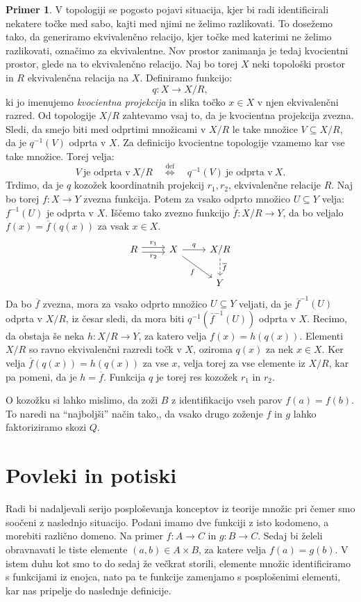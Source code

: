 \documentclass[12pt,a4paper]{book}
\theoremstyle{definition}
\theoremstyle{plain}
\theoremstyle{definition}
\newtheorem{primer}{Primer}[section]
\theoremstyle{remark}
\begin{document}
\begin{primer}
V topologiji se pogosto pojavi situacija, kjer bi radi identificirali nekatere točke med sabo, kajti med njimi ne želimo razlikovati. To dosežemo tako, da generiramo ekvivalenčno relacijo, kjer točke med katerimi ne želimo razlikovati, označimo za ekvivalentne. Nov prostor zanimanja je tedaj kvocientni prostor, glede na to ekvivalenčno relacijo.  Naj bo torej $X$ neki topološki prostor in $R$ ekvivalenčna relacija na $X$. Definiramo funkcijo:
$$ q : X \to X/R,$$
ki jo imenujemo \emph{kvocientna projekcija} in slika točko $x \in X$ v njen ekvivalenčni razred. Od topologije $X/R$ zahtevamo vsaj to, da je kvocientna projekcija zvezna. Sledi, da smejo biti med odprtimi množicami v $X/R$ le take množice $V \subseteq X/R$, da je $q^{-1}(V)$ odprta v $X$. Za definicijo kvocientne topologije vzamemo kar vse take množice. Torej velja:
$$V \ \text{je odprta v} \ X/R \quad \overset{\text{def}}{\Leftrightarrow} \quad q^{-1}(V) \ \text{je odprta v} \ X.$$
Trdimo, da je $q$ kozožek koordinatnih projekcij $r_1,r_2$, ekvivalenčne relacije $R$.
Naj bo torej $f : X \to Y$ zvezna funkcija. Potem za vsako odprto množico $U \subseteq Y$ velja: $f^{-1}(U)$ je odprta v $X$. Iščemo tako zvezno funkcijo $\overline{f} : X/R \to Y$, da bo veljalo $f(x) = \overline{f}(q(x))$ za vsak $x \in X$.
$$\begin{tikzcd}
R \ar[r, shift left, "r_1"] \ar[r, shift right, "r_2"'] & X \ar[r, "q"] \ar[dr, "f"'] & X/R \ar[d, dashed, "\overline{f}"] \\
& & Y
\end{tikzcd}$$
Da bo $\overline{f}$ zvezna, mora za vsako odprto množico $U \subseteq Y$ veljati, da je $\overline{f}^{-1}(U)$ odprta v $X/R$, iz česar sledi, da mora biti $q^{-1}(\overline{f}^{-1}(U))$ odprta v $X$. Recimo, da obstaja še neka $h : X/R \to Y$, za katero velja $f(x) = h(q(x))$. Elementi $X/R$ so ravno ekvivalenčni razredi točk v $X$, oziroma $q(x)$ za nek $x \in X$. Ker velja $\overline{f}(q(x)) = h(q(x))$ za vse $x$, velja torej za vse elemente iz $X/R$, kar pa pomeni, da je $h = \overline{f}$. Funkcija $q$ je torej res kozožek $r_1$ in $r_2$.

\end{primer}

O kozožku si lahko mislimo, da zoži $B$ z identifikacijo vseh parov $f(a) = f(b)$. To naredi na "`najboljši"' način tako,, da vsako drugo zoženje $f$ in $g$ lahko faktoriziramo skozi $Q$.


\section{Povleki in potiski}
Radi bi nadaljevali serijo posploševanja konceptov iz teorije množic pri čemer smo soočeni z naslednjo situacijo. Podani imamo dve funkciji z isto kodomeno, a morebiti različno domeno. Na primer $f:A \to C$ in $g:B \to C$. Sedaj bi želeli obravnavati le tiste elemente $(a,b) \in A \times B$, za katere velja $f(a) = g(b)$. V istem duhu kot smo to do sedaj že večkrat storili, elemente množic identificiramo s funkcijami iz enojca, nato pa te funkcije zamenjamo s posplošenimi elementi, kar nas pripelje do naslednje definicije.
\end{document}
